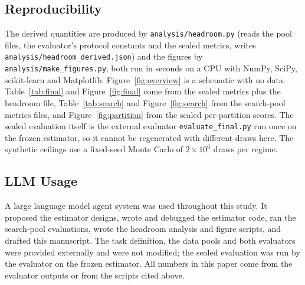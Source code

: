 \documentclass{article}
\begin{document}
\subsection{Reproducibility}
The derived quantities are produced by \texttt{analysis/headroom.py} (reads the pool files, the evaluator's protocol constants and the sealed metrics, writes \texttt{analysis/headroom\_derived.json}) and the figures by \texttt{analysis/make\_figures.py}; both run in seconds on a CPU with NumPy, SciPy, scikit-learn and Matplotlib. Figure~\ref{fig:overview} is a schematic with no data. Table~\ref{tab:final} and Figure~\ref{fig:final} come from the sealed metrics plus the headroom file, Table~\ref{tab:search} and Figure~\ref{fig:search} from the search-pool metrics files, and Figure~\ref{fig:partition} from the sealed per-partition scores. The sealed evaluation itself is the external evaluator \texttt{evaluate\_final.py} run once on the frozen estimator, so it cannot be regenerated with different draws here. The synthetic ceilings use a fixed-seed Monte Carlo of $2\times10^6$ draws per regime.

\subsection{LLM Usage}
A large language model agent system was used throughout this study. It proposed the estimator designs, wrote and debugged the estimator code, ran the search-pool evaluations, wrote the headroom analysis and figure scripts, and drafted this manuscript. The task definition, the data pools and both evaluators were provided externally and were not modified; the sealed evaluation was run by the evaluator on the frozen estimator. All numbers in this paper come from the evaluator outputs or from the scripts cited above.
\end{document}
